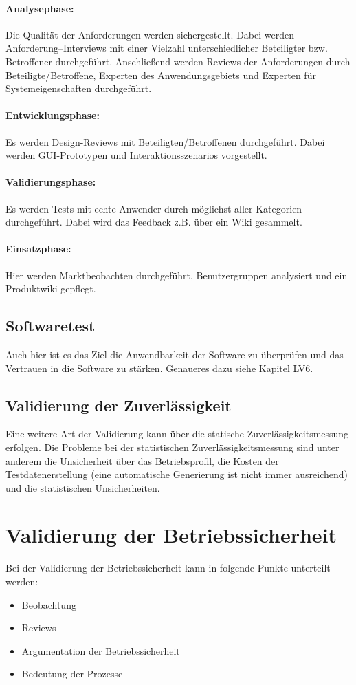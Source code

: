 \paragraph{Analysephase:} Die Qualität der Anforderungen werden sichergestellt. Dabei werden Anforderung--Interviews mit einer Vielzahl unterschiedlicher Beteiligter bzw. Betroffener durchgeführt. Anschließend werden Reviews der Anforderungen durch Beteiligte/Betroffene, Experten des Anwendungsgebiets und Experten für Systemeigenschaften durchgeführt.

\paragraph{Entwicklungsphase:} Es werden Design-Reviews mit Beteiligten/Betroffenen durchgeführt. Dabei werden GUI-Prototypen und Interaktionsszenarios vorgestellt.

\paragraph{Validierungsphase:} Es werden Tests mit echte Anwender durch möglichst aller Kategorien durchgeführt. Dabei wird das Feedback z.B. über ein Wiki gesammelt. 

\paragraph{Einsatzphase:} Hier werden Marktbeobachten durchgeführt, Benutzergruppen analysiert und ein Produktwiki gepflegt.

\subsection{Softwaretest}
Auch hier ist es das Ziel die Anwendbarkeit der Software zu überprüfen und das Vertrauen in die Software zu stärken. Genaueres dazu siehe Kapitel LV6.

\subsection{Validierung der Zuverlässigkeit}
Eine weitere Art der Validierung kann über die statische Zuverlässigkeitsmessung erfolgen. Die Probleme bei der statistischen Zuverlässigkeitsmessung sind unter anderem die Unsicherheit über das Betriebsprofil, die Kosten der Testdatenerstellung (eine automatische Generierung ist nicht immer ausreichend) und die statistischen Unsicherheiten.

\section{Validierung der Betriebssicherheit}
Bei der Validierung der Betriebssicherheit kann in folgende Punkte unterteilt werden:
\begin{itemize}
\item Beobachtung
\item Reviews
\item Argumentation der Betriebssicherheit
\item Bedeutung der Prozesse
\end{itemize}

